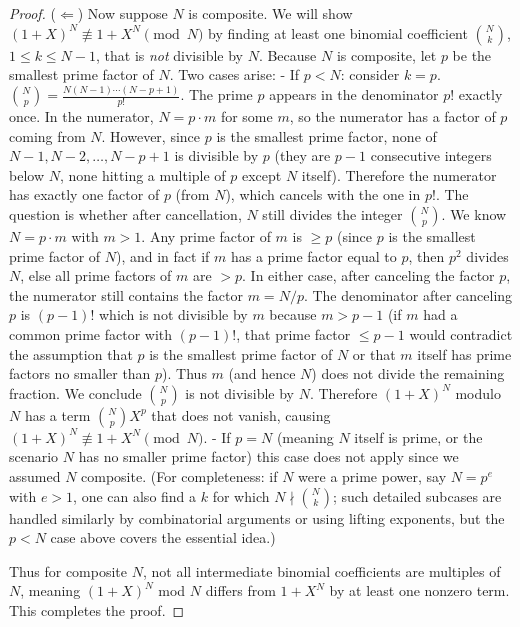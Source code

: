 \documentclass[11pt]{article}
\begin{document}
\begin{proof}
($\Leftarrow$) Now suppose $N$ is composite. We will show $(1+X)^N \not\equiv 1 + X^N \pmod{N}$ by finding at least one binomial coefficient $ \binom{N}{k}$, $1\le k \le N-1$, that is \emph{not} divisible by $N$. Because $N$ is composite, let $p$ be the smallest prime factor of $N$. Two cases arise:
- If $p < N$: consider $k=p$. $\binom{N}{p} = \frac{N (N-1)\cdots (N-p+1)}{p!}$. The prime $p$ appears in the denominator $p!$ exactly once. In the numerator, $N = p \cdot m$ for some $m$, so the numerator has a factor of $p$ coming from $N$. However, since $p$ is the smallest prime factor, none of $N-1, N-2, \dots, N-p+1$ is divisible by $p$ (they are $p-1$ consecutive integers below $N$, none hitting a multiple of $p$ except $N$ itself). Therefore the numerator has exactly one factor of $p$ (from $N$), which cancels with the one in $p!$. The question is whether after cancellation, $N$ still divides the integer $\binom{N}{p}$. We know $N = p \cdot m$ with $m>1$. Any prime factor of $m$ is $\ge p$ (since $p$ is the smallest prime factor of $N$), and in fact if $m$ has a prime factor equal to $p$, then $p^2$ divides $N$, else all prime factors of $m$ are $>p$. In either case, after canceling the factor $p$, the numerator still contains the factor $m = N/p$. The denominator after canceling $p$ is $(p-1)!$ which is not divisible by $m$ because $m > p-1$ (if $m$ had a common prime factor with $(p-1)!$, that prime factor $\le p-1$ would contradict the assumption that $p$ is the smallest prime factor of $N$ or that $m$ itself has prime factors no smaller than $p$). Thus $m$ (and hence $N$) does not divide the remaining fraction. We conclude $\binom{N}{p}$ is not divisible by $N$. Therefore $(1+X)^N$ modulo $N$ has a term $\binom{N}{p}X^p$ that does not vanish, causing $(1+X)^N \not\equiv 1+X^N \pmod{N}$.
- If $p = N$ (meaning $N$ itself is prime, or the scenario $N$ has no smaller prime factor) this case does not apply since we assumed $N$ composite. (For completeness: if $N$ were a prime power, say $N = p^e$ with $e>1$, one can also find a $k$ for which $N \nmid \binom{N}{k}$; such detailed subcases are handled similarly by combinatorial arguments or using lifting exponents, but the $p < N$ case above covers the essential idea.)

Thus for composite $N$, not all intermediate binomial coefficients are multiples of $N$, meaning $(1+X)^N$ mod $N$ differs from $1 + X^N$ by at least one nonzero term. This completes the proof.
\end{proof}
\end{document}

